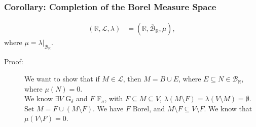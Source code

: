 \documentclass[10pt]{extarticle}
\newcommand{\R}{\mathbb{R}}
\begin{document}
  \subsubsection{Corollary: Completion of the Borel Measure Space}%
  \begin{align*}
    (\R,\mathcal{L},\lambda) &= \left(\R,\overline{\mathcal{B}}_{\R},\overline{\mu}\right),
  \end{align*}
  where $\mu = \lambda|_{\mathcal{B}_{\R}}$.
  \begin{description}
    \item[Proof:] We want to show that if $M\in \mathcal{L}$, then $M = B \cup E$, where $E\subseteq N\in \mathcal{B}_{\R}$, where $\mu(N) = 0$.\\

      We know $\exists V$ G$_{\delta}$ and $F$ F$_{\sigma}$, with $F\subseteq M\subseteq V$, $\lambda(M\setminus F) = \lambda(V\setminus M) = \emptyset$.\\

      Set $M = F \cup (M\setminus F)$. We have $F$ Borel, and $M\setminus F \subseteq V\setminus F$. We know that $\mu(V\setminus F) = 0$.
  \end{description}
\end{document}
